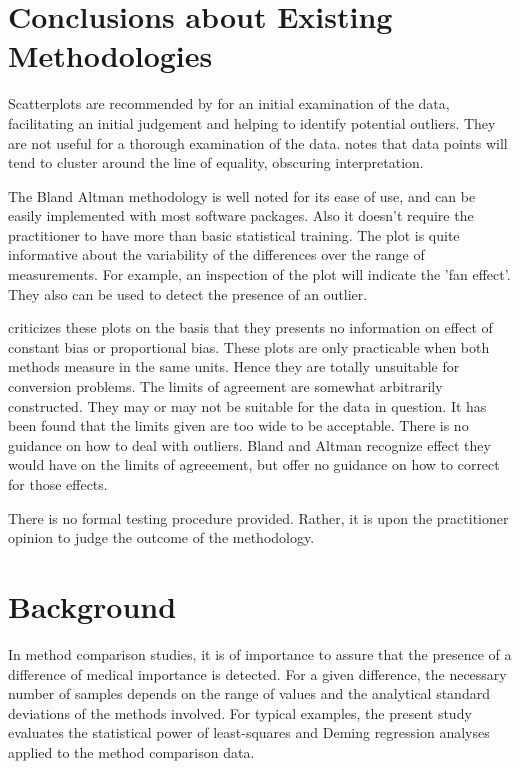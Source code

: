\documentclass[12pt, a4paper]{report}
\theoremstyle{plain}
\theoremstyle{definition}
\theoremstyle{remark}
\begin{document}
\section{Conclusions about Existing Methodologies}

Scatterplots are recommended by \citet{BA83} for an initial
examination of the data, facilitating an initial judgement and
helping to identify potential outliers. They are not useful for a
thorough examination of the data. \citet{BritHypSoc} notes that
data points will tend to cluster around the line of equality,
obscuring interpretation.


The Bland Altman methodology is well noted for its ease of use,
and can be easily implemented with most software packages. Also it
doesn't require the practitioner to have more than basic
statistical training. The plot is quite informative about the
variability of the differences over the range of measurements. For
example, an inspection of the plot will indicate the 'fan effect'.
They also can be used to detect the presence of an outlier.

\citet{ludbrook97,ludbrook02}criticizes these plots on the
basis that they presents no information on effect of constant bias
or proportional bias. These plots are only practicable when both
methods measure in the same units. Hence they are totally
unsuitable for conversion problems. The limits of agreement are
somewhat arbitrarily constructed. They may or may not be suitable
for the data in question. It has been found that the limits given
are too wide to be acceptable. There is no guidance on how to deal
with outliers. Bland and Altman recognize effect they would have
on the limits of agreeement, but offer no guidance on how to
correct for those effects.

There is no formal testing procedure provided. Rather, it is upon
the practitioner opinion to judge the outcome of the methodology.








\section{Background} 
In method comparison studies, it is of importance to assure that the presence of a difference of medical importance is detected. 
For a given difference, the necessary number of samples depends on the range of values and the analytical standard deviations of the methods involved. For typical examples, the present study evaluates the statistical power of least-squares and Deming regression analyses applied to the method comparison data.
\end{document}

